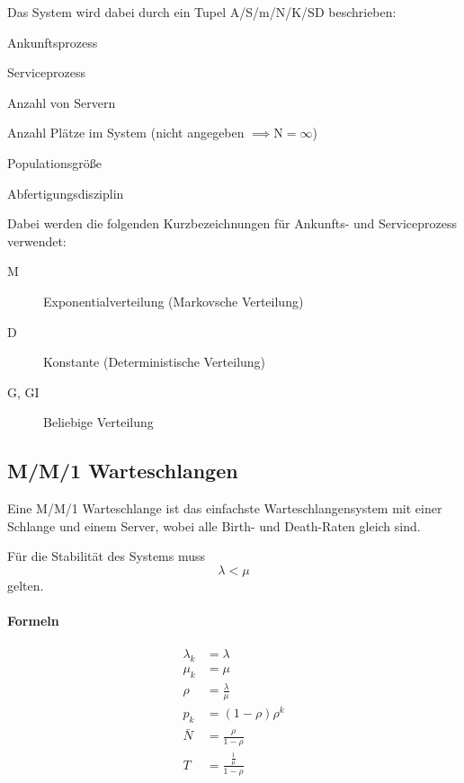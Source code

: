 		Das System wird dabei durch ein Tupel A/S/m/N/K/SD beschrieben:
		\begin{description}[leftmargin = 1cm]
			\item[A] Ankunftsprozess
			\item[S] Serviceprozess
			\item[m] Anzahl von Servern
			\item[N] Anzahl Plätze im System (nicht angegeben \( \implies \text{N} = \infty \))
			\item[K] Populationsgröße
			\item[SD] Abfertigungsdisziplin
		\end{description}
		Dabei werden die folgenden Kurzbezeichnungen für Ankunfts- und Serviceprozess verwendet:
		\begin{description}
			\item[M] Exponentialverteilung (Markovsche Verteilung)
			\item[D] Konstante (Deterministische Verteilung)
			\item[G, GI] Beliebige Verteilung
		\end{description}

		\subsection{M/M/1 Warteschlangen} %
			Eine M/M/1 Warteschlange ist das einfachste Warteschlangensystem mit einer Schlange und einem Server, wobei alle Birth- und Death-Raten gleich sind.

			Für die Stabilität des Systems muss \[ \lambda < \mu \] gelten.

			\paragraph{Formeln}
				\begin{align*}
					\lambda _ k & = \lambda                        \\
					\mu _ k     & = \mu                            \\
					\rho        & = \frac{\lambda}{\mu}            \\
					p _ k       & = (1 - \rho) \rho ^ k            \\
					\bar{N}     & = \frac{\rho}{1 - \rho}          \\
					T           & = \frac{\frac{1}{\mu}}{1 - \rho}
				\end{align*}

